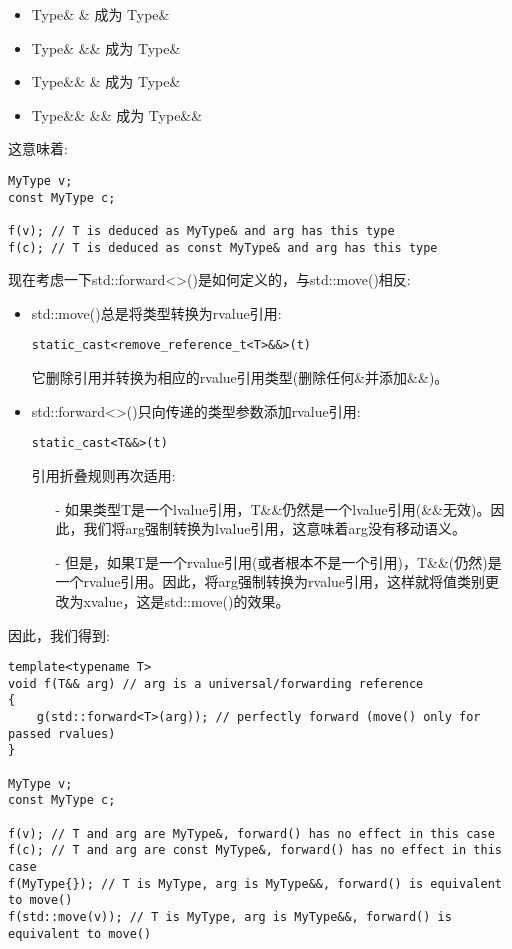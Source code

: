 \begin{itemize}
	\item Type\& \& 成为 Type\&
	\item Type\& \&\& 成为 Type\&
	\item Type\&\& \& 成为 Type\&
	\item Type\&\& \&\& 成为 Type\&\&
\end{itemize}

这意味着:\par

\begin{lstlisting}[caption={}]
MyType v;
const MyType c;

f(v); // T is deduced as MyType& and arg has this type
f(c); // T is deduced as const MyType& and arg has this type
\end{lstlisting}

现在考虑一下std::forward<>()是如何定义的，与std::move()相反:\par

\begin{itemize}
	\item std::move()总是将类型转换为rvalue引用:
	\begin{lstlisting}[caption={}]
	static_cast<remove_reference_t<T>&&>(t)
	\end{lstlisting}
	它删除引用并转换为相应的rvalue引用类型(删除任何\&并添加\&\&)。
	\item std::forward<>()只向传递的类型参数添加rvalue引用:
	\begin{lstlisting}[caption={}]
	static_cast<T&&>(t)
	\end{lstlisting}
	引用折叠规则再次适用:
	\begin{itemize}
		\item[-] 如果类型T是一个lvalue引用，T\&\&仍然是一个lvalue引用(\&\&无效)。因此，我们将arg强制转换为lvalue引用，这意味着arg没有移动语义。
		\item[-] 但是，如果T是一个rvalue引用(或者根本不是一个引用)，T\&\&(仍然)是一个rvalue引用。因此，将arg强制转换为rvalue引用，这样就将值类别更改为xvalue，这是std::move()的效果。
	\end{itemize}
\end{itemize}

因此，我们得到:\par

\begin{lstlisting}[caption={}]
template<typename T>
void f(T&& arg) // arg is a universal/forwarding reference
{
	g(std::forward<T>(arg)); // perfectly forward (move() only for passed rvalues)
}

MyType v;
const MyType c;

f(v); // T and arg are MyType&, forward() has no effect in this case
f(c); // T and arg are const MyType&, forward() has no effect in this case
f(MyType{}); // T is MyType, arg is MyType&&, forward() is equivalent to move()
f(std::move(v)); // T is MyType, arg is MyType&&, forward() is equivalent to move()
\end{lstlisting}

